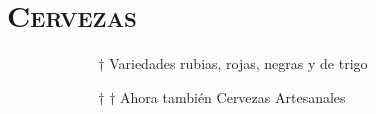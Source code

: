 \section{\textsc{\textbf{Cervezas}}}


$ \>  \>  \>  \>  \>  \>  \>  \>  \>  \>  \>  \>  \>  \>  \>  \>  \>  \>  \>  \>  \>  \>  \>  \>  \>  \>  \>  \>  $ $\dag$ 
Variedades rubias, rojas, negras y de trigo

$ \>  \>  \>  \>  \>  \>  \>  \>  \>  \>  \>  \>  \>  \>  \>  \>  \>  \>  \>  \>  \>  \>  \>  \>  \>  \>  \>  \>  $ $\dag$ $\dag$
Ahora también Cervezas Artesanales 
